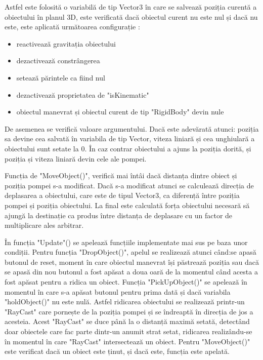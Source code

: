 Astfel este folosită o variabilă de tip Vector3 în care se salvează poziția curentă a obiectului în planul 3D, este verificată dacă obiectul curent nu este nul și dacă nu este, este aplicată următoarea configurație :

\begin{itemize}
	\item reactivează gravitația obiectului
    \item dezactivează constrângerea 
    \item setează părintele ca fiind nul
    \item dezactivează proprietatea de "isKinematic"
    \item obiectul manevrat și obiectul curent de tip "RigidBody" devin nule
\end{itemize}
De asemenea se verifică valoare argumentului. Dacă este adevărată atunci: poziția sa devine cea salvată în variabila de tip Vector, viteza liniară și cea unghiulară a obiectului sunt setate la 0. În caz contrar obiectului a ajuns la poziția dorită, și poziția și viteza liniară devin  cele ale pompei. 

Funcția de "MoveObject()", verifică mai întâi dacă distanța dintre obiect și poziția pompei s-a modificat. Dacă s-a modificat atunci se calculează direcția de deplasarea a obiectului, care este de tipul Vector3, ca diferență între poziția pompei și poziția obiectului. La final este calculată forța obiectului necesară să ajungă la destinație ca produs 
între distanța de deplasare cu un factor de multiplicare ales arbitrar.

În funcția "Update"() se apelează funcțiile implementate mai sus pe baza unor condiții. Pentru  funcția "DropObject()", apelul se realizează atunci când:se apasă butonul de reset, moment în care obiectul manevrat își păstrează poziția sau dacă se apasă din nou butonul a fost apăsat a doua oară de la momentul când acesta a fost apăsat pentru a ridica un obiect. Funcția "PickUpObject()" se apelează în momentul în care s-a apăsat butonul pentru prima dată și dacă variabila "holdObject()" nu este nulă. Astfel ridicarea obiectului se realizează printr-un "RayCast" care pornește de la poziția pompei și se îndreaptă în direcția de jos a acesteia. Acest "RayCast" se duce până la o distanță maximă setată, detectând doar obiectele care fac parte dintr-un anumit strat setat, ridicarea realizându-se în momentul în care "RayCast" intersectează un obiect. Pentru "MoveObject()" este verificat dacă un obiect este ținut, și dacă este, funcția este apelată.

